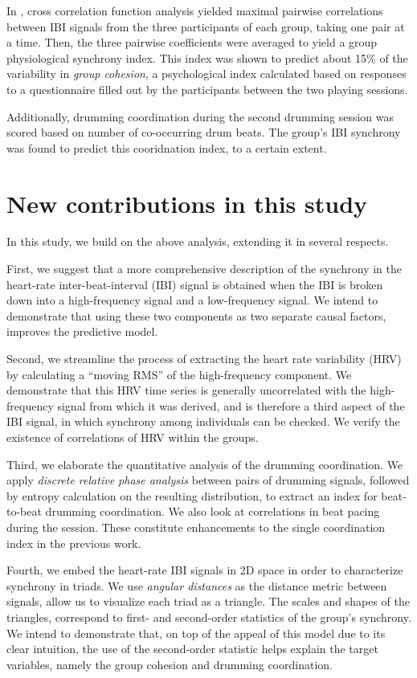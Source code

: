 \documentclass[a4paper, 11pt]{report}      %
\begin{document}
In \cite{gordon2020physio}, cross correlation function analysis yielded maximal pairwise correlations between IBI signals from the three participants of each group, taking one pair at a time. Then, the three pairwise coefficients  were averaged to yield a group physiological synchrony index. This index was shown to predict about 15\% of the variability in \emph{group cohesion}, a psychological index calculated based on responses to a questionnaire filled out by the participants between the two playing sessions. 

Additionally, drumming coordination during the second drumming session was scored based on number of co-occurring drum beats. The group's IBI synchrony was found to predict this cooridnation index, to a certain extent.   

\section{New contributions in this study}

In this study, we build on the above analysis, extending it in several respects.


First, we suggest that a more comprehensive description of the synchrony in the heart-rate inter-beat-interval (IBI) signal is obtained when the IBI is broken down into a high-frequency signal and a low-frequency signal. We intend to demonstrate that using these two components as two separate causal factors, improves the predictive model.


Second, we streamline the process of extracting the heart rate variability (HRV) by calculating a \enquote{moving RMS} of the high-frequency component. We demonstrate that this HRV time series is generally uncorrelated with the high-frequency signal from which it was derived, and is therefore a third aspect of the IBI signal, in which synchrony among individuals can be checked. We verify the existence of correlations of HRV within the groups.  

Third, we elaborate the quantitative analysis of the drumming coordination. We apply \emph{discrete relative phase analysis} \citep{abp2017symmetry} between pairs of drumming signals, followed by entropy calculation on the resulting distribution, to extract an index for beat-to-beat drumming coordination. We also look at correlations in beat pacing during the session. These constitute enhancements to the single coordination index in the previous work.

Fourth, we embed the heart-rate IBI signals in 2D space in order to characterize synchrony in triads. We use \emph{angular distances} as the distance metric between signals, allow us to visualize each triad as a triangle. The scales and shapes of the triangles, correspond to first- and second-order statistics of the group's synchrony. We intend to demonstrate that, on top of the appeal of this model due to its clear intuition, the use of the second-order statistic helps explain the target variables, namely the group cohesion and drumming coordination.
\end{document}
